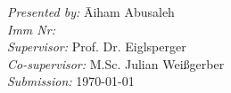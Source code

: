 \begin{titlepage}
{}
\vspace*{20mm}
\begin{tabbing}
\hspace*{4cm}\textit{Presented by:} \hspace*{1.2cm}\= Aiham Abusaleh \\
\hspace*{4cm}\textit{Imm Nr:}  \\
\hspace*{4cm}\textit{Supervisor:} \> Prof. Dr. Eiglsperger\\
\hspace*{4cm}\textit{Co-supervisor:} \> M.Sc. Julian Weißgerber\\
\hspace*{4cm}\textit{Submission:} \> \today
\end{tabbing}
\end{titlepage}